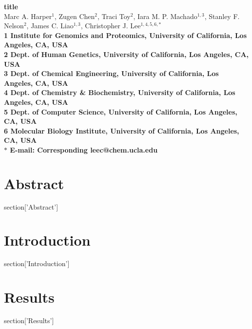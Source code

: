 \documentclass[10pt]{article}
\date{}
\begin{document}
\begin{flushleft}
{\Large
\textbf{ {{ title }} }
}
\\
Marc A. Harper$^{1}$, 
Zugen Chen$^{2}$, 
Traci Toy$^{2}$, 
Iara M. P. Machado$^{1,3}$, 
Stanley F. Nelson$^{2}$, 
James C. Liao$^{1,3}$, 
Christopher J. Lee$^{1,4,5,6,\ast}$
\\
\bf{1} Institute for Genomics and Proteomics, University of California, Los Angeles, CA, USA
\\
\bf{2} Dept. of Human Genetics, University of California, Los Angeles, CA, USA
\\
\bf{3} Dept. of Chemical Engineering,  University of California, Los Angeles, CA, USA
\\
\bf{4} Dept. of Chemistry \& Biochemistry,  University of California, Los Angeles, CA, USA
\\
\bf{5} Dept. of Computer Science,  University of California, Los Angeles, CA, USA
\\
\bf{6} Molecular Biology Institute,  University of California, Los Angeles, CA, USA
\\
$\ast$ E-mail: Corresponding leec@chem.ucla.edu
\end{flushleft}

\section*{Abstract}
{{ section['Abstract'] }}


\section*{Introduction}
{{ section['Introduction'] }}

\section*{Results}
{{ section['Results'] }}
\end{document}
